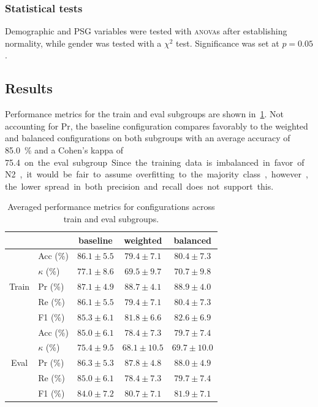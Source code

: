 \subsubsection{Statistical tests}
Demographic and PSG variables were tested with \textsc{anova}s after establishing normality, while gender was tested with a $\chi^{2}$ test.
Significance was set at $p=0.05$.


\subsection{Results}
Performance metrics for the train and eval subgroups are shown in~\cref{tab:train_eval_performance}.
Not accounting for Pr, the baseline configuration compares favorably to the weighted and balanced configurations on both subgroups with an average accuracy of \SI{85.0}{\percent} and a Cohen's kappa of \SI{75.4} on the eval subgroup.
Since the training data is imbalanced in favor of N2, it would be fair to assume overfitting to the majority class, however, the lower spread in both precision and recall does not support this.
\begin{table}[tb]
    \small
    \centering
    \caption[MASSCv1 train and validation performance]{Averaged performance metrics for configurations across train and eval subgroups.}
    \label{tab:train_eval_performance}
    \begin{tabular}{@{}clccc@{}}
        \toprule
                              &          & baseline          & weighted          & balanced          \\ \midrule
        \multirow{5}{*}{Train} & Acc (\%)      & $ \mathbf{86.1 \pm 5.5} $ & $ 79.4 \pm 7.1 $ & $ 80.4 \pm 7.3 $ \\
                              & $\kappa$ (\%) & $ \mathbf{77.1 \pm 8.6} $ & $ 69.5 \pm 9.7 $ & $ 70.7 \pm 9.8 $ \\
                              & Pr (\%)       & $ 87.1 \pm 4.9 $ & $ 88.7 \pm 4.1 $ & $ \mathbf{88.9 \pm 4.0} $ \\
                              & Re (\%)       & $ \mathbf{86.1 \pm 5.5} $ & $ 79.4 \pm 7.1 $ & $ 80.4 \pm 7.3 $ \\
                              & F1 (\%)       & $ \mathbf{85.3 \pm 6.1} $ & $ 81.8 \pm 6.6 $ & $ 82.6 \pm 6.9 $ \\ \midrule
        \multirow{5}{*}{Eval}  & Acc (\%)      & $ \mathbf{85.0 \pm 6.1} $ & $ 78.4 \pm 7.3 $ & $ 79.7 \pm 7.4 $ \\
                              & $\kappa$ (\%) & $ \mathbf{75.4 \pm 9.5} $ & $ 68.1 \pm 10.5 $ & $ 69.7 \pm 10.0 $ \\
                              & Pr (\%)       & $ 86.3 \pm 5.3 $ & $ 87.8 \pm 4.8 $ & $ \mathbf{88.0 \pm 4.9} $ \\
                              & Re (\%)       & $ \mathbf{85.0 \pm 6.1} $ & $ 78.4 \pm 7.3 $ & $ 79.7 \pm 7.4 $ \\
                              & F1 (\%)       & $ \mathbf{84.0 \pm 7.2} $ & $ 80.7 \pm 7.1 $ & $ 81.9 \pm 7.1 $ \\ \bottomrule
    \end{tabular}
\end{table}
